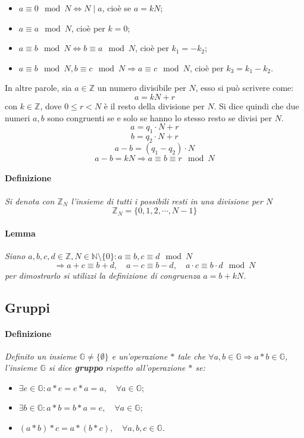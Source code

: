 \documentclass[12pt]{article}
\begin{document}
\begin{itemize}
\item $a\equiv 0 \mod{N} \Leftrightarrow N\mid a$, cioè se $a=kN$;
\item $a\equiv a\mod{N}$, cioè per $k=0$;
\item $a\equiv b\mod{N} \Leftrightarrow b\equiv a\mod{N}$, cioè per $k_1=-k_2$;
\item $a\equiv b\mod {N}, b\equiv c\mod{N} \Rightarrow a\equiv c\mod {N}$, cioè per $k_3=k_1-k_2$.
\end{itemize}

In altre parole, sia $a\in \mathbb{Z}$ un numero divisibile per $N$, esso si può scrivere come:
$$a=kN+r$$
con $k\in \mathbb{Z}$, dove $0\leq r < N$ è il resto della divisione per $N$. Si dice quindi che due numeri $a,b$ sono congruenti se e solo se hanno lo stesso resto se divisi per $N$.
$$a=q_1\cdot N + r$$
$$b=q_2\cdot N + r$$
$$a-b=(q_1-q_2)\cdot N$$
$$a-b=kN\Rightarrow a\equiv b\equiv r \mod{N}$$
\paragraph{Definizione} \textit{Si denota con $\mathbb{Z}_N$ l'insieme di tutti i possibili resti in una divisione per $N$}
$$\mathbb{Z}_N=\{0,1,2,\cdots,N-1\}$$
\paragraph{Lemma} \textit{Siano $a,b,c,d\in \mathbb{Z}, N\in \mathbb{N}\setminus \{ 0\} : a\equiv b, c\equiv d \mod{N}$}
$$\Rightarrow a+c\equiv b+d,\quad a-c\equiv b-d,\quad a\cdot c\equiv b\cdot d \mod{N}$$
\textit{per dimostrarlo si utilizzi la definizione di congruenza $a=b+kN$.}
\subsection{Gruppi}
\paragraph{Definizione} \textit{Definito un insieme $\mathbb{G} \neq \{\emptyset\}$ e un'operazione $*$ tale che $\forall a,b \in \mathbb{G}\Rightarrow a*b\in \mathbb{G}$, l'insieme $\mathbb{G}$ si dice \textbf{gruppo} rispetto all'operazione $*$ se:}
\begin{itemize}
\item $\exists e \in \mathbb{G}: a*e=e*a=a,\quad \forall a \in \mathbb{G}$;
\item $\exists b \in \mathbb{G}: a*b=b*a=e,\quad \forall a \in \mathbb{G}$;
\item $(a*b)*c = a*(b*c), \quad \forall a,b,c \in \mathbb{G}$.
\end{itemize}
\end{document}
